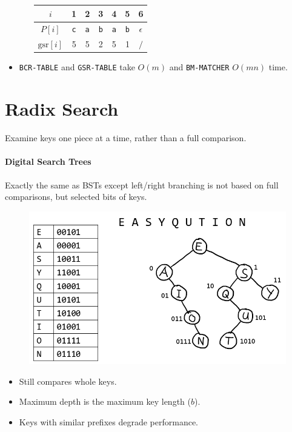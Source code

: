 \documentclass[twocolumn,english]{article}
\providecommand{\tabularnewline}{\\}
\providecommand{\tabularnewline}{\\}
\numberwithin{equation}{section}
\numberwithin{figure}{section}
\numberwithin{table}{section}
\providecommand{\tabularnewline}{\\}
\begin{document}
\begin{itemize}
\begin{itemize}
\begin{table}[H]
\centering{}%
\begin{tabular}{ccccccc}
\toprule 
$i$  & 1  & 2  & 3  & 4  & 5  & 6\tabularnewline
\midrule 
$P\left[i\right]$  & \texttt{c}  & \texttt{a}  & \texttt{b}  & \texttt{a}  & \texttt{b}  & $\epsilon$\tabularnewline
$\text{gsr}\left[i\right]$  & 5  & 5  & 2  & 5  & 1  & $\slash$\tabularnewline
\bottomrule
\end{tabular}
\end{table}


\end{itemize}
\item \texttt{BCR-TABLE} and \texttt{GSR-TABLE} take $O\left(m\right)$
and \texttt{BM-MATCHER} $O\left(mn\right)$ time. 
\end{itemize}

\section{Radix Search}

Examine keys one piece at a time, rather than a full comparison.


\paragraph{Digital Search Trees}

Exactly the same as BSTs except left/right branching is not based
on full comparisons, but selected bits of keys.

\begin{figure}[H]
\centering{}\includegraphics[width=0.625\linewidth]{img/dst} 
\end{figure}

\begin{itemize}
\item Still compares whole keys. 
\item Maximum depth is the maximum key length ($b$). 
\item Keys with similar prefixes degrade performance. 
\end{itemize}
\end{document}
